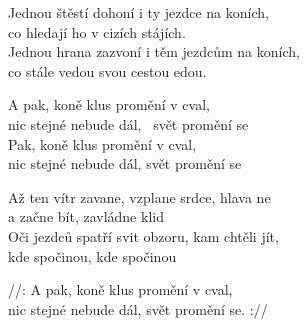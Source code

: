 \ve{}
Jednou štěstí dohoní i ty jezdce na koních,\\
co hledají ho v cizích stájích.\\
Jednou hrana zazvoní i těm jezdcům na koních,\\
co stále vedou svou cestou edou.

\cho{} 
A pak, koně klus promění v cval,\\
nic stejné nebude dál, \ svět promění se\\
Pak, koně klus promění v cval,\\
nic stejné nebude dál, svět promění se

\ve{} 
Až ten vítr zavane, vzplane srdce, hlava ne\\
a začne bít, zavládne klid\\
Oči jezdců spatří svit obzoru, kam chtěli jít,\\
kde spočinou, kde spočinou

\cho{}
//: A pak, koně klus promění v cval,\\
nic stejné nebude dál, svět promění se. ://

\esong{}